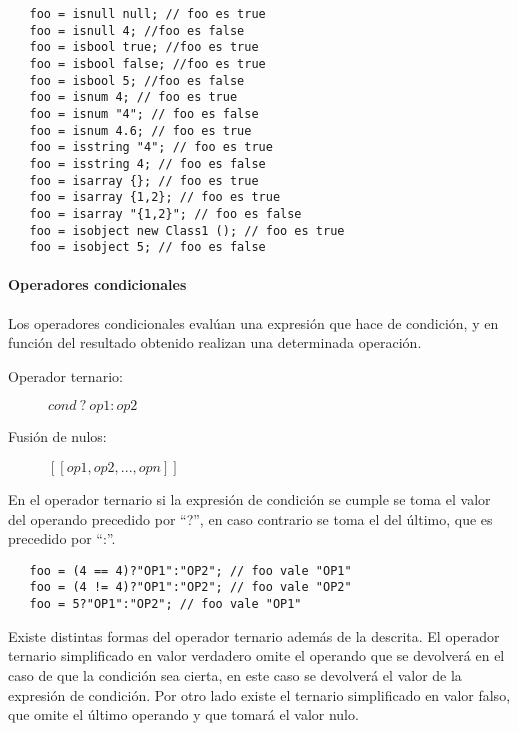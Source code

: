 \begin{lstlisting}
   foo = isnull null; // foo es true
   foo = isnull 4; //foo es false
   foo = isbool true; //foo es true
   foo = isbool false; //foo es true
   foo = isbool 5; //foo es false
   foo = isnum 4; // foo es true
   foo = isnum "4"; // foo es false
   foo = isnum 4.6; // foo es true
   foo = isstring "4"; // foo es true
   foo = isstring 4; // foo es false
   foo = isarray {}; // foo es true
   foo = isarray {1,2}; // foo es true 
   foo = isarray "{1,2}"; // foo es false
   foo = isobject new Class1 (); // foo es true
   foo = isobject 5; // foo es false 
\end{lstlisting} 


\paragraph{Operadores condicionales} \label{sec:op_cond}

Los operadores condicionales evalúan una expresión que hace de condición, y en función del resultado obtenido realizan una determinada operación.

\begin{description}
\item [Operador ternario:] $cond\ ?\ op1:op2$
\item [Fusión de nulos:] $[[ op1, op2,...,opn ]]$
\end{description} 


En el operador ternario si la expresión de condición se cumple se toma el valor del operando precedido por ``?'', en caso contrario se toma el del último, que es precedido por ``:''. \\

\begin{lstlisting}
   foo = (4 == 4)?"OP1":"OP2"; // foo vale "OP1"
   foo = (4 != 4)?"OP1":"OP2"; // foo vale "OP2"
   foo = 5?"OP1":"OP2"; // foo vale "OP1"
\end{lstlisting} 

Existe distintas formas del operador ternario además de la descrita. El operador ternario simplificado en valor verdadero omite el operando que se devolverá en el caso de que la condición 
sea cierta, en este caso se devolverá el valor de la expresión de condición. Por otro lado existe el ternario simplificado en valor falso, que omite el último operando
y que tomará el valor nulo. \\

